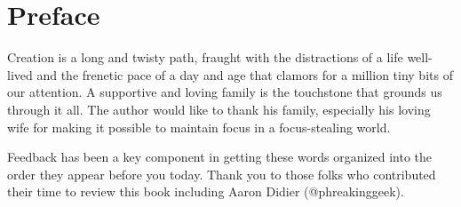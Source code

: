 \chapter*{Preface}
\vspace{5mm}

\justify{}
Creation is a long and twisty path, fraught with the distractions of a life well-lived and the frenetic pace of a day and
age that clamors for a million tiny bits of our attention. A supportive and loving family is the touchstone that grounds
us through it all. The author would like to thank his family, especially his loving wife for making it possible to maintain
focus in a focus-stealing world.

\justify{}
Feedback has been a key component in getting these words organized into the order they appear before you today. Thank you to
those folks who contributed their time to review this book including Aaron Didier (@phreakinggeek).

